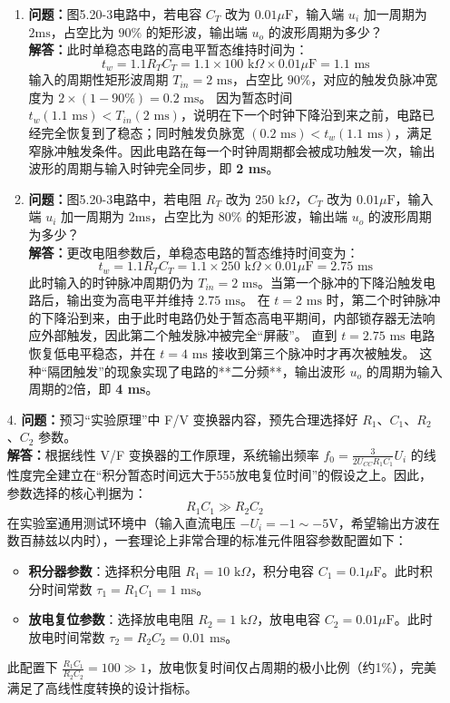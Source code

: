 ﻿\documentclass[10.5pt]{config}
\begin{document}
\begin{enumerate}[label=\arabic*., leftmargin=2em]
\begin{enumerate}[label=(\arabic*)]
        \item \textbf{问题：}图5.20-3电路中，若电容 $C_T$ 改为 $0.01\mu\text{F}$，输入端 $u_i$ 加一周期为 $2\text{ms}$，占空比为 $90\%$ 的矩形波，输出端 $u_o$ 的波形周期为多少？
        \\ \textbf{解答：}此时单稳态电路的高电平暂态维持时间为：
        $$t_w = 1.1 R_T C_T = 1.1 \times 100\text{ k}\Omega \times 0.01\mu\text{F} = 1.1\text{ ms}$$
        输入的周期性矩形波周期 $T_{in} = 2\text{ ms}$，占空比 $90\%$，对应的触发负脉冲宽度为 $2 \times (1 - 90\%) = 0.2\text{ ms}$。
        因为暂态时间 $t_w (1.1\text{ ms}) < T_{in} (2\text{ ms})$，说明在下一个时钟下降沿到来之前，电路已经完全恢复到了稳态；同时触发负脉宽 $(0.2\text{ ms}) < t_w (1.1\text{ ms})$，满足窄脉冲触发条件。因此电路在每一个时钟周期都会被成功触发一次，输出波形的周期与输入时钟完全同步，即 \textbf{2 ms}。

        \item \textbf{问题：}图5.20-3电路中，若电阻 $R_T$ 改为 $250\text{ k}\Omega$，$C_T$ 改为 $0.01\mu\text{F}$，输入端 $u_i$ 加一周期为 $2\text{ms}$，占空比为 $80\%$ 的矩形波，输出端 $u_o$ 的波形周期为多少？
        \\ \textbf{解答：}更改电阻参数后，单稳态电路的暂态维持时间变为：
        $$t_w = 1.1 R_T C_T = 1.1 \times 250\text{ k}\Omega \times 0.01\mu\text{F} = 2.75\text{ ms}$$
        此时输入的时钟脉冲周期仍为 $T_{in} = 2\text{ ms}$。当第一个脉冲的下降沿触发电路后，输出变为高电平并维持 $2.75\text{ ms}$。
        在 $t = 2\text{ ms}$ 时，第二个时钟脉冲的下降沿到来，由于此时电路仍处于暂态高电平期间，内部锁存器无法响应外部触发，因此第二个触发脉冲被完全“屏蔽”。
        直到 $t = 2.75\text{ ms}$ 电路恢复低电平稳态，并在 $t = 4\text{ ms}$ 接收到第三个脉冲时才再次被触发。
        这种“隔团触发”的现象实现了电路的**二分频**，输出波形 $u_o$ 的周期为输入周期的2倍，即 \textbf{4 ms}。
    \end{enumerate}

    \item[4.] \textbf{问题：}预习“实验原理”中 F/V 变换器内容，预先合理选择好 $R_1$、$C_1$、$R_2$、$C_2$ 参数。
    \\ \textbf{解答：}根据线性 V/F 变换器的工作原理，系统输出频率 $f_0 = \frac{3}{2 U_{CC} R_1 C_1} U_i$ 的线性度完全建立在“积分暂态时间远大于555放电复位时间”的假设之上。因此，参数选择的核心判据为：
    $$R_1 C_1 \gg R_2 C_2$$
    在实验室通用测试环境中（输入直流电压 $-U_i = -1 \sim -5\text{V}$，希望输出方波在数百赫兹以内时），一套理论上非常合理的标准元件阻容参数配置如下：
    \begin{itemize}
        \item \textbf{积分器参数}：选择积分电阻 $R_1 = 10\text{ k}\Omega$，积分电容 $C_1 = 0.1\mu\text{F}$。此时积分时间常数 $\tau_1 = R_1 C_1 = 1\text{ ms}$。
        \item \textbf{放电复位参数}：选择放电电阻 $R_2 = 1\text{ k}\Omega$，放电电容 $C_2 = 0.01\mu\text{F}$。此时放电时间常数 $\tau_2 = R_2 C_2 = 0.01\text{ ms}$。
    \end{itemize}
    此配置下 $\frac{R_1 C_1}{R_2 C_2} = 100 \gg 1$，放电恢复时间仅占周期的极小比例（约1\%），完美满足了高线性度转换的设计指标。
\end{enumerate}
\end{document}
